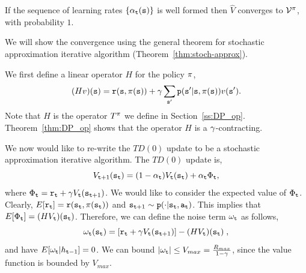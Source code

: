 \begin{theorem}[Convergence $TD(0)$]
\label{thm:TD0-conrg} 
If the sequence of learning rates $\{\alpha_{\tt t}({\tt s})\}$ is well formed then $\widehat{V}$ converges
to $\mathcal{V}^\pi$, with probability $1$.
\end{theorem}

We will show the convergence using the general theorem for
stochastic approximation iterative algorithm
(Theorem~\ref{thm:stoch-approx}).

We first define a linear operator $H$ for the policy $\pi$,
\[
(Hv)({\tt s})={\tt r}({\tt s},\pi({\tt s}))+\gamma\sum_{{\tt s}'}{\tt p}({\tt s}'|{\tt s},\pi({\tt s}))v({\tt s}').
\]
Note that $H$ is the operator $T^\pi$ we define in
Section~\ref{ss:DP_op}. Theorem~\ref{thm:DP_op} shows that the operator $H$ is a $\gamma$-contracting.


We now would like to re-write the $TD(0)$ update to be a stochastic
approximation iterative algorithm. The $TD(0)$ update is,
\[
V_{{\tt t}+1}({\tt s}_{\tt t})=(1-\alpha_{\tt t})V_{\tt t}({\tt s}_{\tt t})+\alpha_{\tt t}
\Phi_{\tt t},
\]
where $\Phi_{\tt t}={\tt r}_{\tt t}+\gamma
V_{\tt t}({\tt s}_{{\tt t}+1})$. We would like to consider the expected
value of $\Phi_{\tt t}$. Clearly,
$E[{\tt r}_{\tt t}]={\tt r}({\tt s}_{\tt t},\pi({\tt s}_{\tt t}))$
and ${\tt s}_{{\tt t}+1} \sim {\tt p}(\cdot |{\tt s}_{\tt t},{\tt a}_{\tt t})$.
This implies that $E[\Phi_{\tt t}]=(HV_{\tt t})({\tt s}_{\tt t})$.
Therefore, we can define the noise term $\omega_{\tt t}$ as follows,
\[
\omega_{\tt t}({\tt s}_{\tt t})=[{\tt r}_{\tt t}+\gamma
V_{\tt t}({\tt s}_{{\tt t}+1})]-(HV_{\tt t})({\tt s}_{\tt t})\;,
\]
and have $E[\omega_{\tt t}|h_{{\tt t}-1}]=0$. We can bound $|\omega_{\tt t}|\leq
V_{max}=\frac{R_{max}}{1-\gamma}$, since the value function is
bounded by $V_{max}$.

